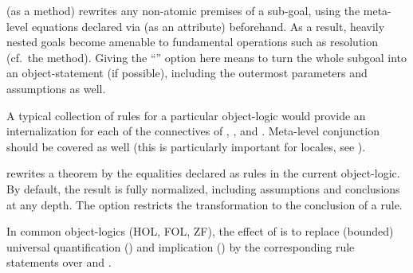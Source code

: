 \begin{isabellebody}
\begin{isamarkuptext}
\begin{description}
  \item \hyperlink{method.atomize}{\mbox{}} (as a method) rewrites any non-atomic
  premises of a sub-goal, using the meta-level equations declared via
  \hyperlink{attribute.atomize}{\mbox{}} (as an attribute) beforehand.  As a result,
  heavily nested goals become amenable to fundamental operations such
  as resolution (cf.\ the \hyperlink{method.rule}{\mbox{}} method).  Giving the ``'' option here means to turn the whole subgoal into an
  object-statement (if possible), including the outermost parameters
  and assumptions as well.

  A typical collection of \hyperlink{attribute.atomize}{\mbox{}} rules for a particular
  object-logic would provide an internalization for each of the
  connectives of , , and .
  Meta-level conjunction should be covered as well (this is
  particularly important for locales, see ).

  \item \hyperlink{attribute.rule-format}{\mbox{}} rewrites a theorem by the equalities
  declared as \hyperlink{attribute.rulify}{\mbox{}} rules in the current object-logic.
  By default, the result is fully normalized, including assumptions
  and conclusions at any depth.  The  option
  restricts the transformation to the conclusion of a rule.

  In common object-logics (HOL, FOL, ZF), the effect of \hyperlink{attribute.rule-format}{\mbox{}} is to replace (bounded) universal quantification
  () and implication () by the corresponding
  rule statements over  and .


\end{description}
\end{isamarkuptext}
\end{isabellebody}

